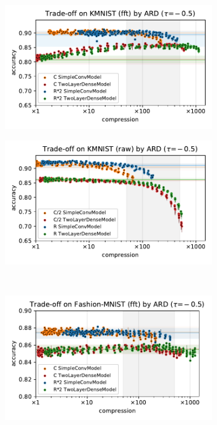 \documentclass[a4paper,10pt,onecolumn]{article}
\begin{document}
\begin{figure}[b]
\begin{subfigure}[b]{0.5\columnwidth}
  \end{subfigure} \\ %
  \begin{subfigure}[b]{0.5\columnwidth}
    \centering
    \includegraphics[width=\columnwidth]{figure__mnist-like__trade-off/appendix__cmp__ARD__kmnist__fft__-0.5.pdf}
  \end{subfigure}%
  \begin{subfigure}[b]{0.5\columnwidth}
    \centering
    \includegraphics[width=\columnwidth]{figure__mnist-like__trade-off/appendix__cmp__ARD__kmnist__raw__-0.5.pdf}
  \end{subfigure} \\ %
  \begin{subfigure}[b]{0.5\columnwidth}
    \centering
    \includegraphics[width=\columnwidth]{figure__mnist-like__trade-off/appendix__cmp__ARD__fashionmnist__fft__-0.5.pdf}

\end{subfigure}
\end{figure}
\end{document}
